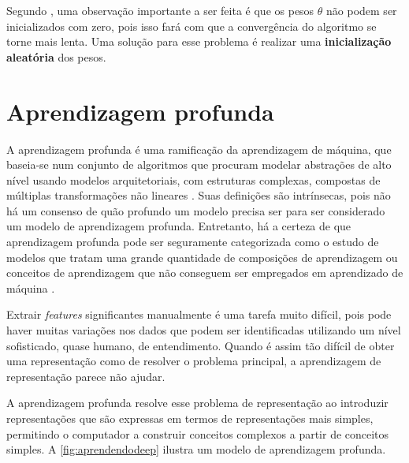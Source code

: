 Segundo \cite{machinelearningcoursera}, uma observação importante a ser feita é que os pesos $\theta$ não podem ser inicializados com zero, pois isso fará com que a convergência do algoritmo se torne mais lenta. Uma solução para esse problema é realizar uma \textbf{inicialização aleatória} dos pesos.





\section{Aprendizagem profunda}

A aprendizagem profunda é uma ramificação da aprendizagem de máquina, que baseia-se num conjunto de algoritmos que procuram modelar abstrações de alto nível usando modelos arquitetoriais, com estruturas complexas, compostas de múltiplas transformações não lineares \cite{deng2014deep}. Suas definições são intrínsecas, pois não há um consenso de quão profundo um modelo precisa ser para ser considerado um modelo de aprendizagem profunda. Entretanto, há a certeza de que aprendizagem profunda pode ser seguramente categorizada como o estudo de modelos que tratam uma grande quantidade de composições de aprendizagem ou conceitos de aprendizagem que não conseguem ser empregados em aprendizado de máquina \cite{Bengio-et-al-2015-Book}. 




Extrair \textit{features} significantes manualmente é uma tarefa muito difícil, pois pode haver muitas variações nos dados que podem ser identificadas utilizando um nível sofisticado, quase humano, de entendimento. Quando é assim tão difícil de obter uma representação como de resolver o problema principal, a aprendizagem de representação parece não ajudar. 

A aprendizagem profunda resolve esse problema de representação ao introduzir representações que são expressas em termos de representações mais simples, permitindo o computador a construir conceitos complexos a partir de conceitos simples. A \autoref{fig:aprendendodeep} ilustra um modelo de aprendizagem profunda.

